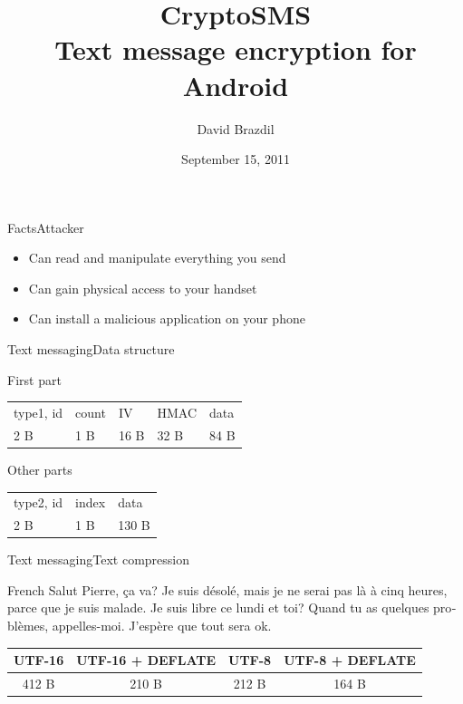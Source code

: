 \documentclass{beamer}
\title[CryptoSMS]{CryptoSMS\\Text message encryption for Android}
\author{David Brazdil}
\institute{University of Cambridge}
\date{September 15, 2011}
\newcommand{\txtFacts}{Facts}
\newcommand{\txtTextCompression}{Text compression}
\newcommand{\txtTextMessaging}{Text messaging}
\newcommand{\verticalspace}{\vspace{10pt}}
\begin{document}
%

\begin{frame}
	\titlepage
\end{frame}


\begin{frame}{\txtFacts}{Attacker}
	\begin{itemize}
		\pause \item{Can read and manipulate everything you send}
		\pause \item{Can gain physical access to your handset}
		\pause \item{Can install a malicious application on your phone}
	\end{itemize}
\end{frame}



\begin{frame}{\txtTextMessaging}{Data structure}

	\begin{block}{First part}
		\verticalspace
		\begin{tabularx}{\textwidth}{ |l|l|l|l|L| }
			\hline
			type1, id   & count   & IV   & HMAC & data \\
			2 B         & 1 B     & 16 B & 32 B & 84 B  \\
			\hline
		\end{tabularx}
	\end{block}

	\begin{block}{Other parts}
		\verticalspace
		\begin{tabularx}{\textwidth}{ |l|l|L| }
			\hline
			type2, id  & index   & data \\
			2 B    & 1 B  & 130 B  \\
			\hline
		\end{tabularx}
	\end{block}
\end{frame}

\begin{frame}{\txtTextMessaging}{\txtTextCompression}
	\begin{exampleblock}{French}
		\foreignlanguage{french}{Salut Pierre, {\c c}a va? Je suis désolé, mais je ne serai pas là à cinq heures, parce que je suis malade. Je suis libre ce lundi et toi? Quand tu as quelques problèmes, appelles-moi. J'espère que tout sera ok.}

		\verticalspace
		\centering
		\begin{tabular}{ |c|c|c|c| }
			\hline
			UTF-16 & UTF-16 + DEFLATE & UTF-8 & UTF-8 + DEFLATE \\
			\hline
			412 B & 210 B & 212 B & 164 B \\
			\hline
		\end{tabular}
	\end{exampleblock}
\end{frame}
\end{document}

